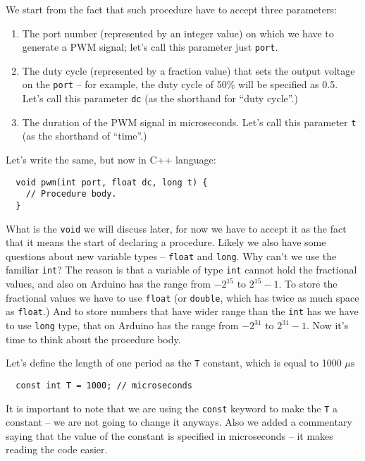 \documentclass[../sparc.tex]{subfiles}
\begin{document}
We start from the fact that such procedure have to accept three parameters:

\begin{enumerate}
\item The port number (represented by an integer value) on which we have to
  generate a PWM signal; let's call this parameter just \texttt{port}.
\item The duty cycle (represented by a fraction value) that sets the output
  voltage on the \texttt{port} -- for example, the duty cycle of 50\% will be
  specified as 0.5.  Let's call this parameter \texttt{dc} (as the shorthand for
  ``duty cycle''.)
\item The duration of the PWM signal in microseconds.  Let's call this parameter
  \texttt{t} (as the shorthand of ``time''.)
\end{enumerate}

Let's write the same, but now in C++ language:

\begin{verbatim}
  void pwm(int port, float dc, long t) {
    // Procedure body.
  }
\end{verbatim}

What is the \texttt{void} we will discuss later, for now we have to accept it as
the fact that it means the start of declaring a procedure.  Likely we also have
some questions about new variable types -- \texttt{float} and \texttt{long}.  Why
can't we use the familiar \texttt{int}?  The reason is that a variable of type
\texttt{int} cannot hold the fractional values, and also on Arduino has the
range from $-2^{15}$ to $2^{15} - 1$.  To store the fractional values we have to
use \texttt{float} (or \texttt{double}, which has twice as much space as
\texttt{float}.)  And to store numbers that have wider range than the
\texttt{int} has we have to use \texttt{long} type, that on Arduino has the
range from $-2^{31}$ to $2^{31} - 1$.  Now it's time to think about the
procedure body.

Let's define the length of one period as the \texttt{T} constant, which is equal
to 1000 $\mu\mbox{s}$

\begin{verbatim}
  const int T = 1000; // microseconds
\end{verbatim}

It is important to note that we are using the \texttt{const} keyword to make the
\texttt{T} a constant -- we are not going to change it anyways.  Also we added a
commentary saying that the value of the constant is specified in microseconds --
it makes reading the code easier.
\end{document}
